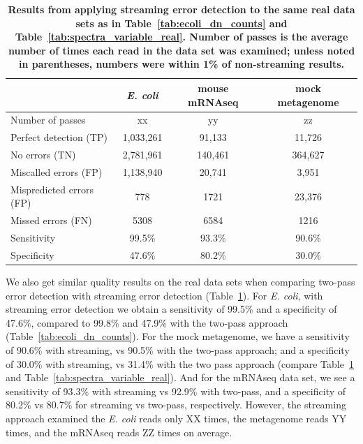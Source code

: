 \documentclass{article}
\begin{document}
\begin{table}
\begin{tabular}{|l|c||c||c|}
\hline
& {\bf \em E. coli} & {\bf mouse mRNAseq} & {\bf mock metagenome} \\
\hline
Number of passes & xx & yy & zz \\
\hline
Perfect detection (TP)   & 1,033,261 & 91,133  & 11,726  \\
No errors (TN)           & 2,781,961 & 140,461 & 364,627 \\
Miscalled errors (FP)    & 1,138,940 & 20,741  & 3,951   \\
Mispredicted errors (FP) & 778       & 1721    & 23,376  \\
Missed errors (FN)       & 5308      & 6584    & 1216    \\
\hline
Sensitivity            & 99.5\%      & 93.3\%  & 90.6\%  \\
Specificity            & 47.6\%      & 80.2\%  & 30.0\%  \\
\hline
\end{tabular}
\caption{{\bf Results from applying streaming error detection to the same
  real data sets as in Table~\ref{tab:ecoli_dn_counts} and
  Table~\ref{tab:spectra_variable_real}.  Number of passes is the average
  number of times each read in the data set was examined; unless noted in
  parentheses, numbers were within 1\% of non-streaming results.}}
\label{tab:spectra_streaming_real}

\end{table}

We also get similar quality results on the real data sets when
comparing two-pass error detection with streaming error detection
(Table~\ref{tab:spectra_streaming_real}).  For {\em E. coli}, with
streaming error detection we obtain a sensitivity of 99.5\% and a
specificity of 47.6\%, compared to 99.8\% and 47.9\% with the two-pass
approach (Table~\ref{tab:ecoli_dn_counts}).  For the mock metagenome,
we have a sensitivity of 90.6\% with streaming, vs 90.5\% with the
two-pass approach; and a specificity of 30.0\% with streaming, vs
31.4\% with the two pass approach (compare
Table~\ref{tab:spectra_streaming_real} and
Table~\ref{tab:spectra_variable_real}).  And for the mRNAseq data set,
we see a sensitivity of 93.3\% with streaming vs 92.9\% with two-pass,
and a specificity of 80.2\% vs 80.7\% for streaming vs two-pass,
respectively.  However, the streaming
approach examined the {\em E. coli} reads only XX times, the
metagenome reads YY times, and the mRNAseq reads ZZ times on average.
\end{document}
